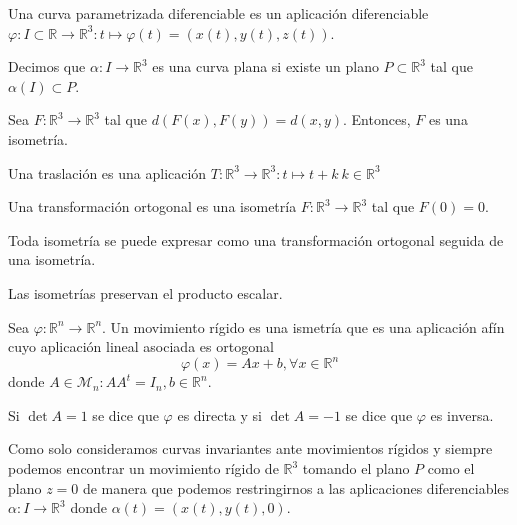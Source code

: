 \begin{defn}
  Una curva parametrizada diferenciable es un aplicación diferenciable $\varphi: I \subset \mathbb{R} \to \mathbb{R}^{3} : t \mapsto  \varphi(t) = (x(t), y(t), z(t))$.
\end{defn}

\begin{obs}
  Decimos que $\alpha: I \to \mathbb{R}^{3}$ es una curva plana si existe un plano $P \subset \mathbb{R}^{3}$ tal que $\alpha(I) \subset P$.
\end{obs}

\begin{defn}[Isometría]
  Sea $F:\mathbb{R}^{3} \to \mathbb{R}^{3}$ tal que $ d(F(x),F(y)) = d(x,y)$. Entonces, $F$ es una isometría.
\end{defn}

\begin{defn}[Traslación]
  Una traslación es una aplicación $T: \mathbb{R}^{3} \to \mathbb{R}^{3} : t \mapsto t + k \ k \in \mathbb{R}^{3}$
\end{defn}

\begin{defn}
  Una transformación ortogonal es una isometría $F: \mathbb{R}^{3} \to \mathbb{R}^{3}$ tal que $F(0) = 0$.
\end{defn}

\begin{theo}
  Toda isometría se puede expresar como una transformación ortogonal seguida de una isometría. 
\end{theo}

\begin{prop}
  Las isometrías preservan el producto escalar.
\end{prop}

\begin{defn}
  Sea $\varphi: \mathbb{R}^{n} \to \mathbb{R}^{n}$. Un movimiento rígido es una ismetría que es una aplicación afín cuyo aplicación lineal asociada es ortogonal 
  \[ 
    \varphi (x) = Ax + b, \forall x \in \mathbb{R}^{n} 
  \] 
  donde $A \in \mathcal{M}_{n} : A A^{t} = I_{n}, b \in \mathbb{R}^{n}$.
\end{defn}

\begin{obs}
  Si $\det{A} = 1$ se dice que $\varphi$ es directa y si $\det{A} = -1$ se dice que $\varphi$ es inversa.
\end{obs}

\begin{obs}
  Como solo consideramos curvas invariantes ante movimientos rígidos y siempre podemos encontrar un movimiento rígido de $\mathbb{R}^{3}$ tomando el plano $P$ como el plano $z = 0$ de manera que podemos restringirnos a las aplicaciones diferenciables $\alpha: I \to \mathbb{R}^{3}$ donde $ \alpha(t) = (x(t), y(t), 0)$.
\end{obs}

